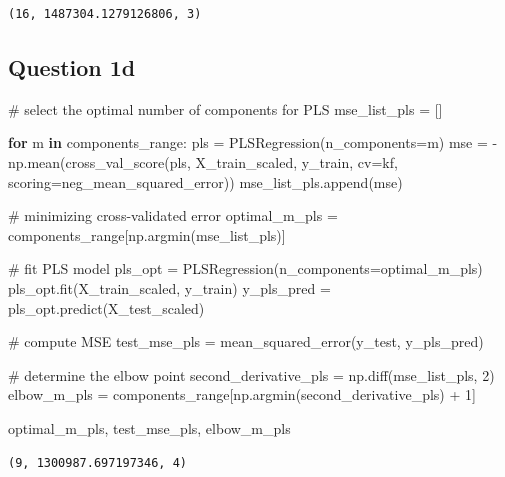 \documentclass[
  letterpaper,
  DIV=11,
  numbers=noendperiod]{scrartcl}
\newenvironment{Shaded}{\begin{snugshade}}{\end{snugshade}}
\newcommand{\CommentTok}[1]{\textcolor[rgb]{0.37,0.37,0.37}{#1}}
\newcommand{\ControlFlowTok}[1]{\textcolor[rgb]{0.00,0.23,0.31}{\textbf{#1}}}
\newcommand{\DecValTok}[1]{\textcolor[rgb]{0.68,0.00,0.00}{#1}}
\newcommand{\KeywordTok}[1]{\textcolor[rgb]{0.00,0.23,0.31}{\textbf{#1}}}
\newcommand{\NormalTok}[1]{\textcolor[rgb]{0.00,0.23,0.31}{#1}}
\newcommand{\OperatorTok}[1]{\textcolor[rgb]{0.37,0.37,0.37}{#1}}
\newcommand{\StringTok}[1]{\textcolor[rgb]{0.13,0.47,0.30}{#1}}
\begin{document}
\begin{verbatim}
(16, 1487304.1279126806, 3)
\end{verbatim}

\subsection{Question 1d}\label{question-1d}

\begin{Shaded}
\begin{Highlighting}[]
\CommentTok{\# select the optimal number of components for PLS}
\NormalTok{mse\_list\_pls }\OperatorTok{=}\NormalTok{ []}

\ControlFlowTok{for}\NormalTok{ m }\KeywordTok{in}\NormalTok{ components\_range:}
\NormalTok{    pls }\OperatorTok{=}\NormalTok{ PLSRegression(n\_components}\OperatorTok{=}\NormalTok{m)}
\NormalTok{    mse }\OperatorTok{=} \OperatorTok{{-}}\NormalTok{np.mean(cross\_val\_score(pls, X\_train\_scaled, y\_train,}
\NormalTok{                   cv}\OperatorTok{=}\NormalTok{kf, scoring}\OperatorTok{=}\StringTok{\textquotesingle{}neg\_mean\_squared\_error\textquotesingle{}}\NormalTok{))}
\NormalTok{    mse\_list\_pls.append(mse)}

\CommentTok{\# minimizing cross{-}validated error}
\NormalTok{optimal\_m\_pls }\OperatorTok{=}\NormalTok{ components\_range[np.argmin(mse\_list\_pls)]}

\CommentTok{\# fit PLS model}
\NormalTok{pls\_opt }\OperatorTok{=}\NormalTok{ PLSRegression(n\_components}\OperatorTok{=}\NormalTok{optimal\_m\_pls)}
\NormalTok{pls\_opt.fit(X\_train\_scaled, y\_train)}
\NormalTok{y\_pls\_pred }\OperatorTok{=}\NormalTok{ pls\_opt.predict(X\_test\_scaled)}

\CommentTok{\# compute MSE}
\NormalTok{test\_mse\_pls }\OperatorTok{=}\NormalTok{ mean\_squared\_error(y\_test, y\_pls\_pred)}

\CommentTok{\# determine the elbow point}
\NormalTok{second\_derivative\_pls }\OperatorTok{=}\NormalTok{ np.diff(mse\_list\_pls, }\DecValTok{2}\NormalTok{)}
\NormalTok{elbow\_m\_pls }\OperatorTok{=}\NormalTok{ components\_range[np.argmin(second\_derivative\_pls) }\OperatorTok{+} \DecValTok{1}\NormalTok{]}

\NormalTok{optimal\_m\_pls, test\_mse\_pls, elbow\_m\_pls}
\end{Highlighting}
\end{Shaded}

\begin{verbatim}
(9, 1300987.697197346, 4)
\end{verbatim}
\end{document}
